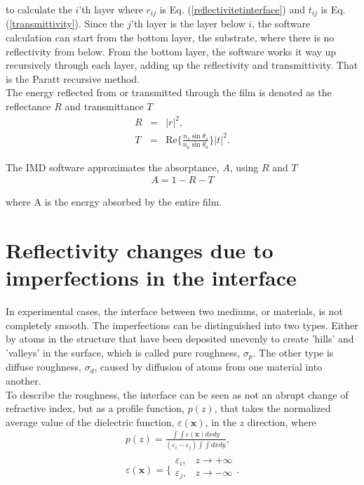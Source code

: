 to calculate the $i$'th layer where $r_{ij}$ is Eq. (\ref{reflectivitetinterface}) and $t_{ij}$ is Eq. (\ref{transmittivity}). Since the $j$'th layer is the layer below $i$, the software calculation can start from the bottom layer, the substrate, where there is no reflectivity from below. From the bottom layer, the software works it way up recursively through each layer, adding up the reflectivity and transmittivity. That is the Paratt recursive method\cite{Parratt:1954wb}.\\
The energy reflected from or transmitted through the film is denoted as the reflectance $R$ and transmittance $T$
\begin{eqnarray}
	R &=& |r|^2,\\
	T &=& \mathrm{Re}\Bigg\{\frac{n_s \sin{\theta_s}}{n_a \sin{\theta_a}}\Bigg\}|t|^2.
\end{eqnarray}

The IMD software approximates the absorptance, $A$, using $R$ and $T$
\begin{eqnarray}
	A = 1-R-T
\end{eqnarray}

where A is the energy absorbed by the entire film.

\section{Reflectivity changes due to imperfections in the interface}
In experimental cases, the interface between two mediums, or materials, is not completely smooth. The imperfections can be distinguished into two types. Either by atoms in the structure that have been deposited unevenly to create 'hills' and 'valleys' in the surface, which is called pure roughness, $\sigma_p$. The other type is diffuse roughness, $\sigma_d$, caused by diffusion of atoms from one material into another.\\
To describe the roughness, the interface can be seen as not an abrupt change of refractive index, but as a profile function, $p(z)$\cite{Stearns:1989va}, that takes the normalized average value of the dielectric function, $\varepsilon(\mathbf{x})$, in the $z$ direction, where
\begin{eqnarray}
	p(z) = \frac{\int \int \varepsilon(\mathbf{x})dxdy}{(\varepsilon_i-\varepsilon_j)\int \int dxdy}, \\
	\varepsilon(\mathbf{x}) = \Bigg\{
	\begin{array}{rl}
		\varepsilon_i, & z \rightarrow + \infty \\
		\varepsilon_j, & z \rightarrow - \infty \\
	\end{array}.
\end{eqnarray}

